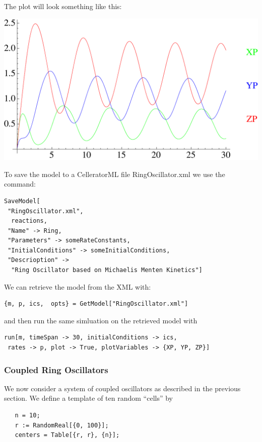 \documentclass[12pt,letterpaper]{article}
\begin{document}
The plot will look something like this:
\begin{center}
\includegraphics[scale=0.5]{ring-oscillator.pdf}
\end{center}
  
To save the model to a CelleratorML file {\ttfamily RingOscillator.xml} we use the command:
\begin{verbatim}
SaveModel[
 "RingOscillator.xml", 
  reactions, 
 "Name" -> Ring, 
 "Parameters" -> someRateConstants, 
 "InitialConditions" -> someInitialConditions, 
 "Descrioption" -> 
  "Ring Oscillator based on Michaelis Menten Kinetics"]
\end{verbatim}  
We can retrieve the model from the XML with:

\begin{verbatim}
{m, p, ics,  opts} = GetModel["RingOscillator.xml"]
\end{verbatim}

and then run the same simluation on the retrieved model with

\begin{verbatim}
run[m, timeSpan -> 30, initialConditions -> ics, 
 rates -> p, plot -> True, plotVariables -> {XP, YP, ZP}]
 \end{verbatim}

\subsubsection{Coupled Ring Oscillators}

We now consider a system of coupled oscillators as described in the previous section. We define a template of
ten random ``cells'' by

\begin{verbatim}
   n = 10; 
   r := RandomReal[{0, 100}]; 
   centers = Table[{r, r}, {n}];
\end{verbatim}
\end{document}
